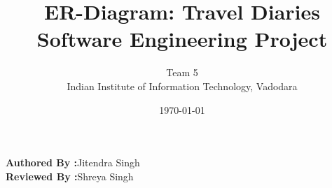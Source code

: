 \documentclass[12pt]{article}
\title{ER-Diagram: Travel Diaries\\Software Engineering Project }
\author{Team 5\\Indian Institute of Information Technology, Vadodara}
\date{\today}
\begin{document}
	\maketitle
	\begin{center}
		\textbf{\Large{Authored By :}}\Large{Jitendra Singh}  \\
		\textbf{\Large{Reviewed By :}}\Large{Shreya Singh} \\[2\baselineskip]  
	\end{center}
		
	
\end{document}
